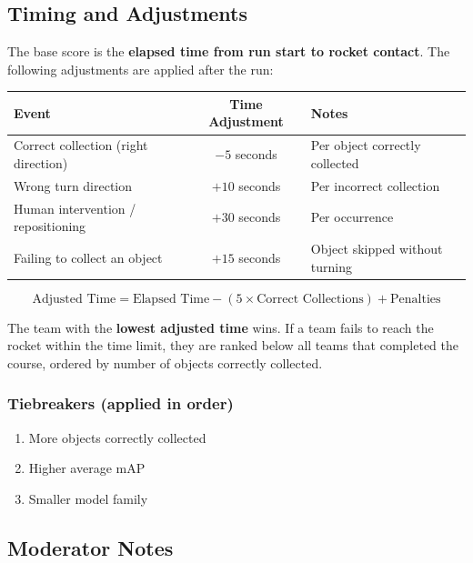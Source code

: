 \documentclass[11pt,a4paper]{article}
\begin{document}
\subsection{Timing and Adjustments}

The base score is the \textbf{elapsed time from run start to rocket contact}. The following adjustments are applied after the run:

\begin{center}
\begin{tabular}{|l|c|l|}
\hline
\textbf{Event} & \textbf{Time Adjustment} & \textbf{Notes} \\
\hline
Correct collection (right direction) & $-5$ seconds  & Per object correctly collected \\
Wrong turn direction                 & $+10$ seconds & Per incorrect collection \\
Human intervention / repositioning  & $+30$ seconds & Per occurrence \\
Failing to collect an object         & $+15$ seconds & Object skipped without turning \\
\hline
\end{tabular}
\end{center}

\begin{equation}
    \text{Adjusted Time} = \text{Elapsed Time} - (5 \times \text{Correct Collections}) + \text{Penalties}
\end{equation}

The team with the \textbf{lowest adjusted time} wins. If a team fails to reach the rocket within the time limit, they are ranked below all teams that completed the course, ordered by number of objects correctly collected.

\subsubsection*{Tiebreakers (applied in order)}

\begin{enumerate}
    \item More objects correctly collected
    \item Higher average mAP
    \item Smaller model family
\end{enumerate}

\subsection{Moderator Notes}
\end{document}
